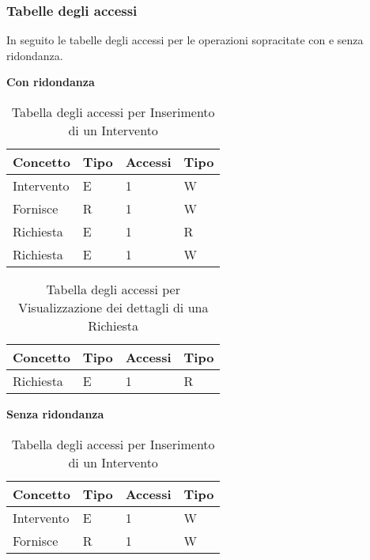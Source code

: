\documentclass{article}
\begin{document}
\subsubsection{Tabelle degli accessi }
In seguito le tabelle degli accessi per le operazioni sopracitate con e senza ridondanza.

\textbf{Con ridondanza}

\begin{table}[h]
    \centering
    \begin{adjustbox}{width=0.6\textwidth}
        \begin{tabular}{|m{2cm}|m{2cm}|m{2cm}|m{2cm}|}
            \hline  
            \textbf{Concetto} & \textbf{Tipo} & \textbf{Accessi} & \textbf{Tipo}\\ 
            \hline
            Intervento & E & 1 & W\\
            \hline
            Fornisce & R & 1 & W\\
            \hline
            Richiesta & E & 1 & R\\
            \hline
            Richiesta & E & 1 & W\\
            \hline            
        \end{tabular}
    \end{adjustbox}
    \caption{Tabella degli accessi per Inserimento di un Intervento}
    \label{tab:accesstable}
\end{table}

\begin{table}[h]
    \centering
    \begin{adjustbox}{width=0.6\textwidth}
        \begin{tabular}{|m{2cm}|m{2cm}|m{2cm}|m{2cm}|}
            \hline  
            \textbf{Concetto} & \textbf{Tipo} & \textbf{Accessi} & \textbf{Tipo}\\ 
            \hline
            Richiesta & E & 1 & R\\
            \hline            
        \end{tabular}
    \end{adjustbox}
    \caption{Tabella degli accessi per Visualizzazione dei dettagli di una Richiesta}
    \label{tab:accesstable}
\end{table}

\textbf{Senza ridondanza}

\begin{table}[h]
    \centering
    \begin{adjustbox}{width=0.6\textwidth}
        \begin{tabular}{|m{2cm}|m{2cm}|m{2cm}|m{2cm}|}
            \hline  
            \textbf{Concetto} & \textbf{Tipo} & \textbf{Accessi} & \textbf{Tipo}\\ 
            \hline
            Intervento & E & 1 & W\\
            \hline
            Fornisce & R & 1 & W\\
            \hline
        \end{tabular}
    \end{adjustbox}
    \caption{Tabella degli accessi per Inserimento di un Intervento}
    \label{tab:accesstable}
\end{table}
\end{document}
